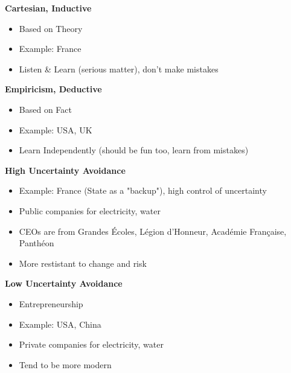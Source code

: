 \documentclass[11pt,a4paper,oneside,french,svgnames]{report}
\begin{document}
\begin{center}
\begin{minipage}[t]{.49\textwidth}
\centering\textbf{Cartesian, Inductive}\\
  \begin{itemize}
    \item Based on Theory
    \item Example: France
    \item Listen \& Learn (serious matter), don't make mistakes
  \end{itemize}
\end{minipage}
\begin{minipage}[t]{.49\textwidth}
\centering\textbf{Empiricism, Deductive}\\
  \begin{itemize}
    \item Based on Fact
    \item Example: USA, UK
    \item Learn Independently (should be fun too, learn from mistakes)
  \end{itemize}
\end{minipage}

\begin{minipage}[t]{.49\textwidth}
\centering\textbf{High Uncertainty Avoidance}\\
  \begin{itemize}
    \item Example: France (State as a "backup"), high control of uncertainty
    \item Public companies for electricity, water
    \item CEOs are from Grandes Écoles, Légion d'Honneur, Académie Française, Panthéon
    \item More restistant to change and risk
  \end{itemize}
\end{minipage}
\begin{minipage}[t]{.49\textwidth}
\centering\textbf{Low Uncertainty Avoidance}\\
  \begin{itemize}
    \item Entrepreneurship
    \item Example: USA, China
    \item Private companies for electricity, water
    \item Tend to be more modern
  \end{itemize}
\end{minipage}


\end{center}
\end{document}
